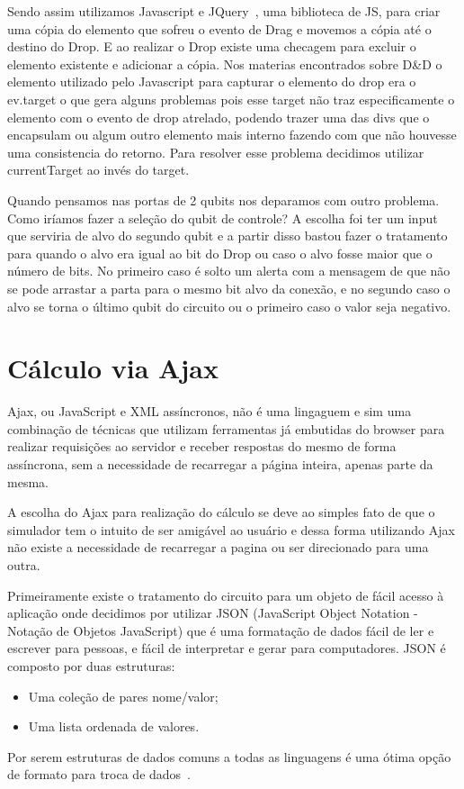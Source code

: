 \documentclass[a4paper, 12pt, oneside]{book}
\begin{document}
Sendo assim utilizamos Javascript e JQuery~\cite{jquery}, uma biblioteca de JS, para criar uma cópia do elemento que sofreu o evento de Drag e movemos a cópia até o destino do Drop. E ao realizar o Drop existe uma checagem para excluir o elemento existente e adicionar a cópia. Nos materias encontrados sobre D\&{D} o elemento utilizado pelo Javascript para capturar o elemento do drop era o ev.target o que gera alguns problemas pois esse target não traz especificamente o elemento com o evento de drop atrelado, podendo trazer uma das divs que o encapsulam ou algum outro elemento mais interno fazendo com que não houvesse uma consistencia do retorno. Para resolver esse problema decidimos utilizar currentTarget ao invés do target.

Quando pensamos nas portas de 2 qubits nos deparamos com outro problema. Como iríamos fazer a seleção do qubit de controle? A escolha foi ter um input que serviria de alvo do segundo qubit e a partir disso bastou fazer o tratamento para quando o alvo era igual ao bit do Drop ou caso o alvo fosse maior que o número de bits. No primeiro caso é solto um alerta com a mensagem de que não se pode arrastar a parta para o mesmo bit alvo da conexão, e no segundo caso o alvo se torna o último qubit do circuito ou o primeiro caso o valor seja negativo.

\section{Cálculo via Ajax}

Ajax, ou JavaScript e XML assíncronos, não é uma lingaguem e sim uma combinação de técnicas que utilizam ferramentas já embutidas do browser para realizar requisições ao servidor e receber respostas do mesmo de forma assíncrona, sem a necessidade de recarregar a página inteira, apenas parte da mesma.

A escolha do Ajax para realização do cálculo se deve ao simples fato de que o simulador tem o intuito de ser amigável ao usuário e dessa forma utilizando Ajax não existe a necessidade de recarregar a pagina ou ser direcionado para uma outra.

Primeiramente existe o tratamento do circuito para um objeto de fácil acesso à aplicação onde decidimos por utilizar JSON (JavaScript Object Notation - Notação de Objetos JavaScript) que é uma formatação de dados fácil de ler e escrever para pessoas, e fácil de interpretar e gerar para computadores. JSON é composto por duas estruturas:
\begin{itemize}
\item Uma coleção de pares nome/valor;
\item Uma lista ordenada de valores.
\end{itemize}
Por serem estruturas de dados comuns a todas as linguagens é uma ótima opção de formato para troca de dados~\cite{json}.
\end{document}
